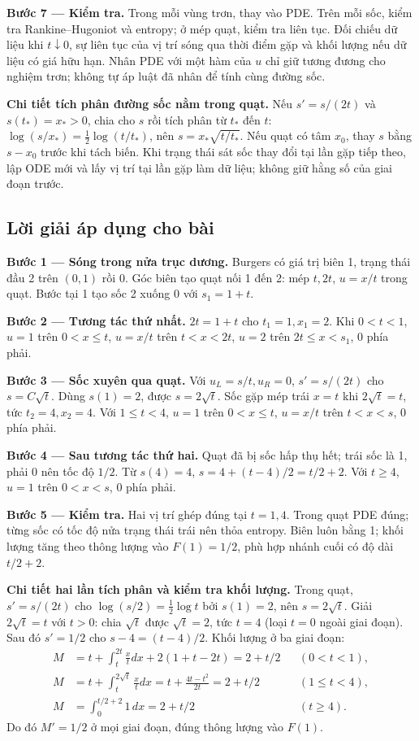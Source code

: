 \documentclass[10pt,a4paper]{article}
\begin{document}
\textbf{Bước 7 — Kiểm tra.} Trong mỗi vùng trơn, thay vào PDE. Trên mỗi sốc, kiểm tra Rankine–Hugoniot và entropy; ở mép quạt, kiểm tra liên tục. Đối chiếu dữ liệu khi $t\downarrow0$, sự liên tục của vị trí sóng qua thời điểm gặp và khối lượng nếu dữ liệu có giá hữu hạn. Nhân PDE với một hàm của $u$ chỉ giữ tương đương cho nghiệm trơn; không tự áp luật đã nhân để tính cùng đường sốc.

\textbf{Chi tiết tích phân đường sốc nằm trong quạt.} Nếu $s'=s/(2t)$ và $s(t_*)=x_*>0$, chia cho $s$ rồi tích phân từ $t_*$ đến $t$: $\log(s/x_*)=\frac12\log(t/t_*)$, nên $s=x_*\sqrt{t/t_*}$. Nếu quạt có tâm $x_0$, thay $s$ bằng $s-x_0$ trước khi tách biến. Khi trạng thái sát sốc thay đổi tại lần gặp tiếp theo, lập ODE mới và lấy vị trí tại lần gặp làm dữ liệu; không giữ hằng số của giai đoạn trước.
\subsection*{Lời giải áp dụng cho bài}
\textbf{Bước 1 — Sóng trong nửa trục dương.} Burgers có giá trị biên 1, trạng thái đầu 2 trên $(0,1)$ rồi 0. Góc biên tạo quạt nối 1 đến 2: mép $t,2t$, $u=x/t$ trong quạt. Bước tại 1 tạo sốc 2 xuống 0 với $s_1=1+t$.

\textbf{Bước 2 — Tương tác thứ nhất.} $2t=1+t$ cho $t_1=1,x_1=2$. Khi $0<t<1$, $u=1$ trên $0<x\le t$, $u=x/t$ trên $t<x<2t$, $u=2$ trên $2t\le x<s_1$, 0 phía phải.

\textbf{Bước 3 — Sốc xuyên qua quạt.} Với $u_L=s/t,u_R=0$, $s'=s/(2t)$ cho $s=C\sqrt t$. Dùng $s(1)=2$, được $s=2\sqrt t$. Sốc gặp mép trái $x=t$ khi $2\sqrt t=t$, tức $t_2=4,x_2=4$. Với $1\le t<4$, $u=1$ trên $0<x\le t$, $u=x/t$ trên $t<x<s$, 0 phía phải.

\textbf{Bước 4 — Sau tương tác thứ hai.} Quạt đã bị sốc hấp thụ hết; trái sốc là 1, phải 0 nên tốc độ $1/2$. Từ $s(4)=4$, $s=4+(t-4)/2=t/2+2$. Với $t\ge4$, $u=1$ trên $0<x<s$, 0 phía phải.

\textbf{Bước 5 — Kiểm tra.} Hai vị trí ghép đúng tại $t=1,4$. Trong quạt PDE đúng; từng sốc có tốc độ nửa trạng thái trái nên thỏa entropy. Biên luôn bằng 1; khối lượng tăng theo thông lượng vào $F(1)=1/2$, phù hợp nhánh cuối có độ dài $t/2+2$.

\textbf{Chi tiết hai lần tích phân và kiểm tra khối lượng.} Trong quạt, $s'=s/(2t)$ cho $\log(s/2)=\frac12\log t$ bởi $s(1)=2$, nên $s=2\sqrt t$. Giải $2\sqrt t=t$ với $t>0$: chia $\sqrt t$ được $\sqrt t=2$, tức $t=4$ (loại $t=0$ ngoài giai đoạn). Sau đó $s'=1/2$ cho $s-4=(t-4)/2$. Khối lượng ở ba giai đoạn:
\[\begin{aligned}
M&=t+\int_t^{2t}\frac xtdx+2(1+t-2t)=2+t/2 &&(0<t<1),\\
M&=t+\int_t^{2\sqrt t}\frac xtdx=t+\frac{4t-t^2}{2t}=2+t/2 &&(1\le t<4),\\
M&=\int_0^{t/2+2}1\,dx=2+t/2 &&(t\ge4).
\end{aligned}\]
Do đó $M'=1/2$ ở mọi giai đoạn, đúng thông lượng vào $F(1)$.
\end{document}
